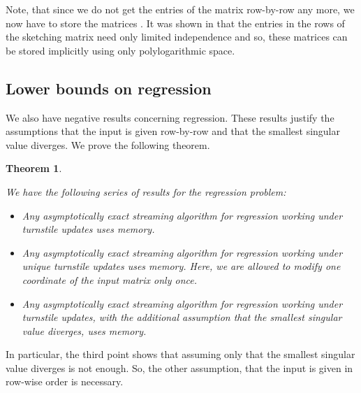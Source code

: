 \documentclass[a4paper,11pt,oneside,english,onecolumn]{article}
\newtheorem{theorem}{Theorem}
\theoremstyle{definition}
\begin{document}
Note, that since we do not get the entries of the matrix row-by-row any more, we now have to store the matrices . It was shown in \cite{LinAlgStream} that the entries in the rows of the sketching matrix need only limited independence and so, these matrices can be stored implicitly using only polylogarithmic space.

\subsection{Lower bounds on regression}

We also have negative results concerning regression. These results justify the assumptions that the input is given row-by-row and that the smallest singular value diverges. We prove the following theorem.
\begin{theorem}
\label{lemma:negativeRegression}

We have the following series of results for the regression problem:
\begin{itemize}
\item Any asymptotically exact streaming algorithm for regression working under turnstile updates uses  memory.
\item Any asymptotically exact streaming algorithm for regression working under unique turnstile updates uses  memory. Here, we are allowed to modify one coordinate of the input matrix only once.
\item Any asymptotically exact streaming algorithm for regression working under turnstile updates, with the additional assumption that the smallest singular value diverges, uses  memory.
\end{itemize}
\end{theorem}

In particular, the third point shows that assuming only that the smallest singular value diverges is not enough. So, the other assumption, that the input is given in row-wise order is necessary.
\end{document}
